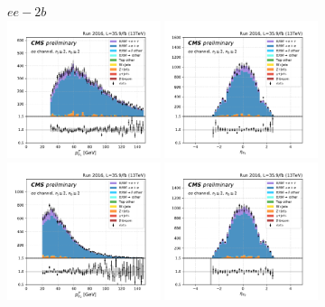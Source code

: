 \begin{figure}[ht]
    \centering
    $ee - 2b$ \\
    \includegraphics[width=0.4\textwidth]{chapters/Analysis/sectionPlots/figures/kinematics_pickles/ee/2b/ee_2b_lepton1_pt.pdf}
    \includegraphics[width=0.4\textwidth]{chapters/Analysis/sectionPlots/figures/kinematics_pickles/ee/2b/ee_2b_lepton1_eta.pdf}
    \includegraphics[width=0.4\textwidth]{chapters/Analysis/sectionPlots/figures/kinematics_pickles/ee/2b/ee_2b_lepton2_pt.pdf}
    \includegraphics[width=0.4\textwidth]{chapters/Analysis/sectionPlots/figures/kinematics_pickles/ee/2b/ee_2b_lepton2_eta.pdf}

\end{figure}
